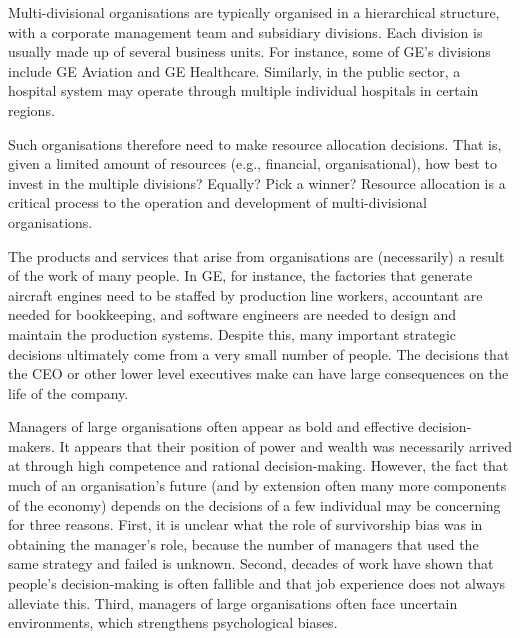 \documentclass[a4paper, nobind, dvipsnames]{templates/ociamthesis}
\theoremstyle{definition}
\theoremstyle{definition}
\theoremstyle{definition}
\theoremstyle{definition}
\theoremstyle{remark}
\begin{document}
Multi-divisional organisations are typically organised in a hierarchical
structure, with a corporate management team and subsidiary divisions. Each
division is usually made up of several business units. For instance, some of
GE's divisions include GE Aviation and GE Healthcare. Similarly, in the public
sector, a hospital system may operate through multiple individual hospitals in
certain regions.

Such organisations therefore need to make resource allocation decisions. That
is, given a limited amount of resources (e.g., financial, organisational), how
best to invest in the multiple divisions? Equally? Pick a winner? Resource
allocation is a critical process to the operation and development of
multi-divisional organisations.

The products and services that arise from organisations are (necessarily) a
result of the work of many people. In GE, for instance, the factories that
generate aircraft engines need to be staffed by production line workers,
accountant are needed for bookkeeping, and software engineers are needed to
design and maintain the production systems. Despite this, many important
strategic decisions ultimately come from a very small number of people. The
decisions that the CEO or other lower level executives make can have large
consequences on the life of the company.

Managers of large organisations often appear as bold and effective
decision-makers. It appears that their position of power and wealth was
necessarily arrived at through high competence and rational decision-making.
However, the fact that much of an organisation's future (and by extension often
many more components of the economy) depends on the decisions of a few
individual may be concerning for three reasons. First, it is unclear what the
role of survivorship bias was in obtaining the manager's role, because the
number of managers that used the same strategy and failed is unknown. Second,
decades of work have shown that people's decision-making is often fallible and
that job experience does not always alleviate this. Third, managers of large
organisations often face uncertain environments, which strengthens psychological
biases.
\end{document}
